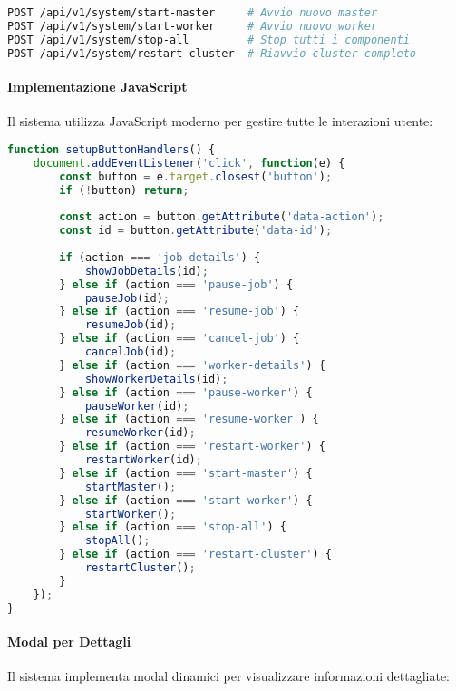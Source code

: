\documentclass[12pt,a4paper]{article}
\begin{document}
\begin{lstlisting}[language=bash, caption=API Endpoints per Controllo Sistema]
POST /api/v1/system/start-master     # Avvio nuovo master
POST /api/v1/system/start-worker     # Avvio nuovo worker
POST /api/v1/system/stop-all         # Stop tutti i componenti
POST /api/v1/system/restart-cluster  # Riavvio cluster completo
\end{lstlisting}

\paragraph{Implementazione JavaScript}
Il sistema utilizza JavaScript moderno per gestire tutte le interazioni utente:

\begin{lstlisting}[language=javascript, caption=Gestione Click Bottoni in dashboard.js]
function setupButtonHandlers() {
    document.addEventListener('click', function(e) {
        const button = e.target.closest('button');
        if (!button) return;
        
        const action = button.getAttribute('data-action');
        const id = button.getAttribute('data-id');
        
        if (action === 'job-details') {
            showJobDetails(id);
        } else if (action === 'pause-job') {
            pauseJob(id);
        } else if (action === 'resume-job') {
            resumeJob(id);
        } else if (action === 'cancel-job') {
            cancelJob(id);
        } else if (action === 'worker-details') {
            showWorkerDetails(id);
        } else if (action === 'pause-worker') {
            pauseWorker(id);
        } else if (action === 'resume-worker') {
            resumeWorker(id);
        } else if (action === 'restart-worker') {
            restartWorker(id);
        } else if (action === 'start-master') {
            startMaster();
        } else if (action === 'start-worker') {
            startWorker();
        } else if (action === 'stop-all') {
            stopAll();
        } else if (action === 'restart-cluster') {
            restartCluster();
        }
    });
}
\end{lstlisting}

\paragraph{Modal per Dettagli}
Il sistema implementa modal dinamici per visualizzare informazioni dettagliate:
\end{document}
